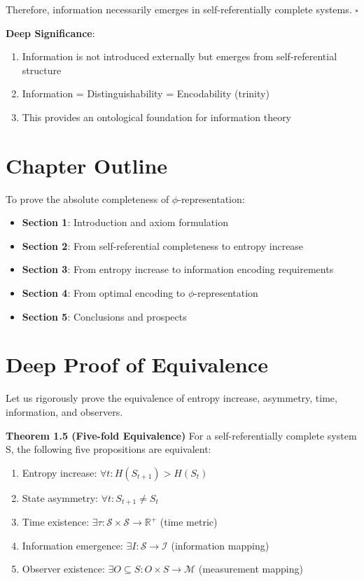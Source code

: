 Therefore, information necessarily emerges in self-referentially complete systems. $\square$

\textbf{Deep Significance}:
\begin{enumerate}
\item Information is not introduced externally but emerges from self-referential structure
\item Information = Distinguishability = Encodability (trinity)
\item This provides an ontological foundation for information theory
\end{enumerate}

\section{Chapter Outline}
\label{sec:ch01_axiom_and_derivation:chapter-outline}

To prove the absolute completeness of $\phi$-representation:

\begin{itemize}
\item \textbf{Section 1}: Introduction and axiom formulation
\item \textbf{Section 2}: From self-referential completeness to entropy increase
\item \textbf{Section 3}: From entropy increase to information encoding requirements
\item \textbf{Section 4}: From optimal encoding to $\phi$-representation
\item \textbf{Section 5}: Conclusions and prospects
\end{itemize}

\section{Deep Proof of Equivalence}
\label{sec:ch01_axiom_and_derivation:deep-proof-of-equivalence}

Let us rigorously prove the equivalence of entropy increase, asymmetry, time, information, and observers.

\textbf{Theorem 1.5 (Five-fold Equivalence)}
\label{thm:1.5}
For a self-referentially complete system S, the following five propositions are equivalent:
\begin{enumerate}
\item Entropy increase: $\forall t: H(S_{t+1}) > H(S_t)$
\item State asymmetry: $\forall t: S_{t+1} \neq S_t$  
\item Time existence: $\exists \tau: \mathcal{S} \times \mathcal{S} \to \mathbb{R}^+$ (time metric)
\item Information emergence: $\exists I: \mathcal{S} \to \mathcal{I}$ (information mapping)
\item Observer existence: $\exists O \subseteq S: O \times S \to \mathcal{M}$ (measurement mapping)
\end{enumerate}

